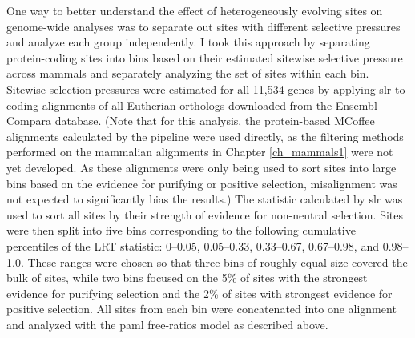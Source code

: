 One way to better understand the effect of heterogeneously evolving
sites on genome-wide \dnds analyses was to separate out sites with
different selective pressures and analyze each group independently. I
took this approach by separating protein-coding sites into bins based
on their estimated sitewise selective pressure across mammals and
separately analyzing the set of sites within each bin. Sitewise
selection pressures were estimated for all 11,534 genes by applying
\ac{slr} \citep{Massingham2005} to coding alignments of all Eutherian
orthologs downloaded from the Ensembl Compara database. (Note that for
this analysis, the protein-based MCoffee alignments calculated by the
\ens pipeline were used directly, as the filtering methods performed
on the mammalian alignments in Chapter \ref{ch_mammals1} were not yet
developed. As these alignments were only being used to sort sites into
large bins based on the evidence for purifying or positive selection,
misalignment was not expected to significantly bias the results.)  The
\slrt statistic calculated by \ac{slr} was used to sort all sites by
their strength of evidence for non-neutral selection. Sites were then
split into five bins corresponding to the following cumulative
percentiles of the LRT statistic: 0--0.05, 0.05--0.33, 0.33--0.67,
0.67--0.98, and 0.98--1.0. These ranges were chosen so that three bins
of roughly equal size covered the bulk of sites, while two bins
focused on the 5\% of sites with the strongest evidence for purifying
selection and the 2\% of sites with strongest evidence for positive
selection. All sites from each bin were concatenated into one
alignment and analyzed with the \ac{paml} free-ratios model as
described above.

